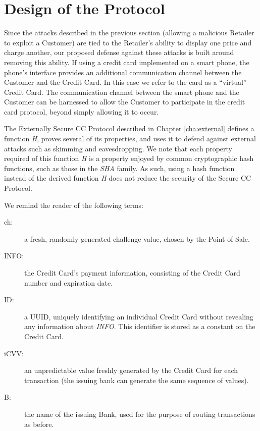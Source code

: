\section{Design of the Protocol}
\label{sec:secure-design}

Since the attacks described in the previous section (allowing a malicious Retailer to exploit a Customer)
	are tied to the Retailer's ability to display one price and charge another,
	our proposed defense against these attacks is built around removing this ability.
If using a credit card implemented on a smart phone, the phone's interface provides an additional communication channel between the Customer and the Credit Card.
In this case we refer to the card as a ``virtual'' Credit Card.
The communication channel between the smart phone and the Customer can be harnessed to allow the Customer to participate in the credit card protocol,
	beyond simply allowing it to occur.

The Externally Secure CC Protocol described in Chapter \ref{cha:external} defines a function \emph{H},
    proves several of its properties, and uses it to defend against external attacks such as skimming and eavesdropping.
We note that each property required of this function \emph{H} is a property enjoyed by common cryptographic hash functions,
    such as those in the \emph{SHA} family.
As such, using a hash function instead of the derived function \emph{H} does not reduce the security of the Secure CC Protocol.

We remind the reader of the following terms:

\begin{description}
\item[ch:] a fresh, randomly generated challenge value, chosen by the Point of Sale.
\item[INFO:] the Credit Card's payment information, consisting of the Credit Card number and expiration date.
\item[ID:] a UUID, uniquely identifying an individual Credit Card without revealing any information about \emph{INFO}.
	This identifier is stored as a constant on the Credit Card.
\item[iCVV:] an unpredictable value freshly generated by the Credit Card for each transaction (the issuing bank can generate the same sequence of values).
\item[B:] the name of the issuing Bank, used for the purpose of routing transactions as before.
\end{description}

